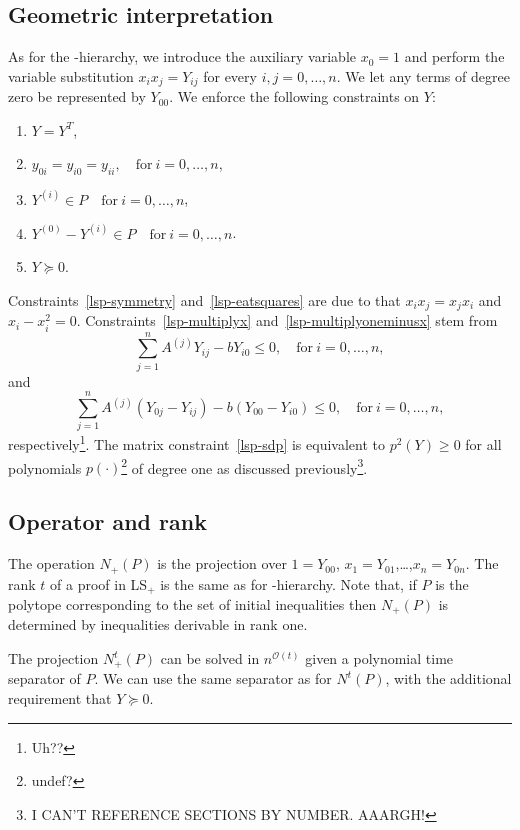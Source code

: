 \documentclass[a4paper,twoside,justified]{tufte-handout}
\begin{document}
\subsection{Geometric interpretation}
As for the \Lovasz-\Schrijver hierarchy, we introduce the auxiliary variable $x_0=1$ and perform the variable substitution $x_ix_j=Y_{ij}$ for every $i,j=0,\ldots,n$. We let any terms of degree zero be represented by $Y_{00}$. We enforce the following constraints on $Y$:
\begin{enumerate}
\item \label{lsp-symmetry} $Y=Y^T$,
\item \label{lsp-eatsquares} $y_{0i}=y_{i0}=y_{ii}, \quad\text{for}\ i=0,\ldots,n$,
\item \label{lsp-multiplyx} $Y^{(i)}\in P \quad\text{for}\ i=0,\ldots,n$,
\item \label{lsp-multiplyoneminusx} $Y^{(0)}-Y^{(i)}\in P \quad\text{for}\ i=0,\ldots,n$.
\item \label{lsp-sdp} $Y\succeq0$.
\end{enumerate}
Constraints~\ref{lsp-symmetry} and~\ref{lsp-eatsquares} are due to that $x_ix_j=x_jx_i$ and $x_i-x_i^2=0$. Constraints~\ref{lsp-multiplyx} and~\ref{lsp-multiplyoneminusx} stem from 
\[\sum_{j=1}^{n} A^{(j)}Y_{ij}-bY_{i0}\leq 0, \quad\text{for}\ i=0,\ldots,n,\]
and 
\[\sum_{j=1}^{n} A^{(j)}(Y_{0j}-Y_{ij})-b(Y_{00}-Y_{i0})\leq 0, \quad\text{for}\ i=0,\ldots,n,\]
respectively\footnote{Uh??}. The matrix constraint~\ref{lsp-sdp} is equivalent to $p^2(Y)\geq0$ for all polynomials $p(\cdot)$\footnote{undef?} of degree one as discussed previously\footnote{I CAN'T REFERENCE SECTIONS BY NUMBER. AAARGH!}.

\subsection{Operator and rank}
The operation $N_+(P)$ is the projection over $1=Y_{00}$, $x_1=Y_{01}$,\ldots,$x_n=Y_{0n}$. The rank $t$ of a proof in LS$_+$ is the same as for \Lovasz-\Schrijver hierarchy. Note that, if $P$ is the polytope corresponding to the set of initial inequalities then $N_+(P)$ is determined by inequalities derivable in rank one. 

The projection $N_+^t(P)$ can be solved in $n^{\mathcal{O}(t)}$ given a polynomial time separator of $P$. We can use the same separator as for $N^t(P)$, with the additional requirement that $Y\succeq0$.
\end{document}
